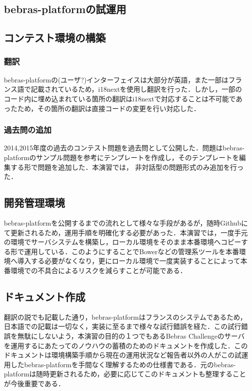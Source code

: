 \documentclass[a4paper]{jarticle}
\begin{document}
\begin{multicols}{2}
\section{bebras-platformの試運用}
\subsection{コンテスト環境の構築}
\subsubsection{翻訳}
bebras-platformの(ユーザ?)インターフェイスは大部分が英語，また一部はフランス語で記載されているため，i18nextを使用し翻訳を行った．しかし，一部のコード内に埋め込まれている箇所の翻訳はi18nextで対応することは不可能であったため，その箇所の翻訳は直接コードの変更を行い対応した．
\subsubsection{過去問の追加}
2014,2015年度の過去のコンテスト問題を過去問として公開した．問題はbebras-platformのサンプル問題を参考にテンプレートを作成し，そのテンプレートを編集する形で問題を追加した．本演習では，
非対話型の問題形式のみ追加を行った．

\subsection{開発管理環境}
bebras-platformを公開するまでの流れとして様々な手段があるが，随時Githubにて更新されるため，運用手順を明確化する必要があった．本演習では，一度手元の環境でサーバシステムを構築し，ローカル環境をそのまま本番環境へコピーする形で運用している．このようにすることでBowerなどの管理系ツールを本番環境へ導入する必要がなくなり，更にローカル環境で一度実装することによって本番環境での不具合によるリスクを減らすことが可能である．

\subsection{ドキュメント作成}
翻訳の説でも記載した通り，bebras-platformはフランスのシステムであるため，日本語での記載は一切なく，実装に至るまで様々な試行錯誤を経た．この試行錯誤を無駄にしないよう，本演習の目的の１つでもあるBebras Challengeのサーバを運用するにあたってのノウハウの蓄積のためのドキュメントを作成した．このドキュメントは環境構築手順から現在の運用状況など報告者以外の人がこの試運用したbebras-platformを手間なく理解するための仕様書である．元のbebras-platformは随時更新されるため，必要に応じてこのドキュメントも整理することが今後重要である．


\end{multicols}
\end{document}
